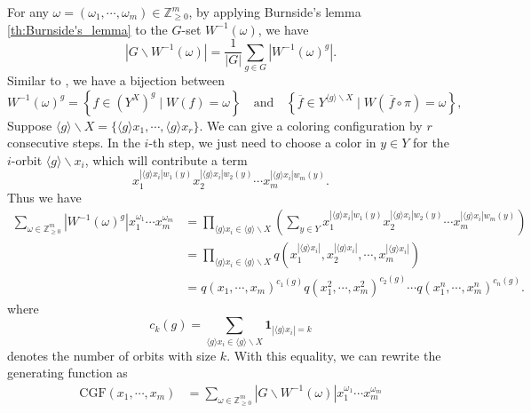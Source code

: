 \begin{prf}
    For any $\omega=(\omega_1,\cdots,\omega_m)\in\mathbb{Z}_{\ge 0}^m$, by applying Burnside's lemma \ref{th:Burnside's_lemma} to the $G$-set $W^{-1}(\omega)$, we have
    \[
        \left|G\backslash W^{-1}(\omega)\right| =\frac{1}{|G|}\sum_{g\in G}\left|W^{-1}(\omega)^g\right|.
    \]
    Similar to , we have a bijection between
    \[
        W^{-1}(\omega)^g=\left\{f\in \left(Y^X\right)^g\mid W(f)=\omega\right\}\quad\text{and}\quad\left\{\overline{f}\in Y^{\langle g\rangle\backslash X}\mid W\left(\,\overline{f}\circ\pi\right)=\omega\right\},
    \]
    Suppose $\langle g\rangle\backslash X=\{\langle g\rangle x_1,\cdots,\langle g\rangle x_r\}$. We can give a coloring configuration by $r$ consecutive steps. In the $i$-th step, we just need to choose a color in $y\in Y$ for the $i$-orbit $\langle g\rangle\backslash x_i$, which will contribute a term
    $$
        x_1^{|\langle g\rangle x_i| w_1(y)}x_2^{|\langle g\rangle x_i|w_2(y)}\cdots x_m^{|\langle g\rangle x_i| w_m(y)}.
    $$
    Thus we have
    \begin{align*}
        \sum_{\omega\in\mathbb{Z}_{\ge 0}^m} \left |W^{-1}(\omega)^g\right |x_1^{\omega_1} \cdots x_m^{\omega_m} & = \prod_{\langle g\rangle x_i \in \langle g\rangle\backslash X }\left(\sum_{y\in Y}x_1^{|\langle g\rangle x_i|w_1(y)}x_2^{|\langle g\rangle x_i|w_2(y)}\cdots x_m^{|\langle g\rangle x_i|w_m(y)}\right) \\
                                                                                                                 & = \prod_{\langle g\rangle x_i \in \langle g\rangle\backslash X } q\left (x_1^{|\langle g\rangle x_i|}, x_2^{|\langle g\rangle x_i|}, \cdots,x_m^{|\langle g\rangle x_i|}\right )                        \\
                                                                                                                 & = q(x_1,  \cdots,x_m)^{c_1(g)} q \left (x_1^2, \cdots,x_m^2 \right )^{c_2(g)} \cdots q \left (x_1^n, \cdots,x_m^n\right )^{c_n(g)}.
    \end{align*}
    where
    $$
        c_k(g)=\sum_{\langle g\rangle x_i \in \langle g\rangle\backslash X}\mathbf{1}_{|\langle g\rangle x_i |=k}
    $$
    denotes the number of orbits with size $k$. With this equality, we can rewrite the generating function as
    \begin{align*}
        \mathrm{CGF}\left(x_1, \cdots,x_m\right) & =\sum_{\omega \in \mathbb{Z}_{\ge 0}^m}\left|G\backslash W^{-1}(\omega)\right| x_1^{\omega_1} \cdots x_m^{\omega_m}                                          \\

\end{align*}
\end{prf}
